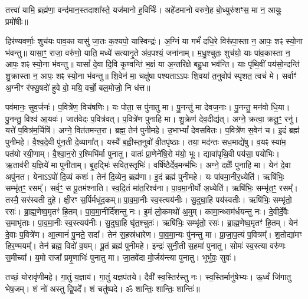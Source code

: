 तत्त्वा॑ यामि॒ ब्रह्म॑णा॒ वन्द॑मान॒स्तदाशा᳚स्ते॒ यज॑मानो ह॒विर्भिः॑। 
अहे॑डमानो वरुणे॒ह बो॒ध्युरु॑शꣳस॒ मा न॒ आयुः॒ प्रमो॑षीः॥

हिर॑ण्यवर्णाः॒ शुच॑यः पाव॒का यासु॑ जा॒तः क॒श्यपो॒ यास्विन्द्रः॑।
अ॒ग्निं या गर्भं॑ दधि॒रे विरू॑पा॒स्ता न॒ आपः॒ शꣴ स्यो॒ना भ॑वन्तु॥ 
यासा॒ꣳ॒ राजा॒ वरु॑णो॒ याति॒ मध्ये॑ सत्यानृ॒ते अ॑व॒पश्यं॒ जना॑नाम्।
म॒धु॒श्चुतः॒ शुच॑यो॒ याः पा॑व॒कास्ता न॒ आपः॒ शꣴ स्यो॒ना भ॑वन्तु॥ 
यासां᳚ दे॒वा दि॒वि कृ॒ण्वन्ति॑ भ॒क्षं या अ॒न्तरि॑क्षे बहु॒धा भव॑न्ति।
याः पृ॑थि॒वीं पय॑सो॒न्दन्ति॑ शु॒क्रास्ता न॒ आपः॒ शꣴ स्यो॒ना भ॑वन्तु॥ 
शि॒वेन॑ मा॒ चक्षु॑षा पश्यताऽऽपः शि॒वया॑ त॒नुवोप॑ स्पृशत॒ त्वचं॑ मे।
सर्वाꣳ॑ अ॒ग्नीꣳ र॑फ्सु॒षदो॑ हुवे वो॒ मयि॒ वर्चो॒ बल॒मोजो॒ नि ध॑त्त॥

पव॑मानः॒ सुव॒र्जनः॑। प॒वित्रे॑ण॒ विच॑\ur{}षणिः। यः पोता॒ स पु॑नातु मा। पु॒नन्तु॑ मा देवज॒नाः।
पु॒नन्तु॒ मन॑वो धि॒या। पु॒नन्तु॒ विश्व॑ आ॒यवः॑। जात॑वेदः प॒वित्र॑वत्। प॒वित्रे॑ण पुनाहि मा।
शु॒क्रेण॑ देव॒दीद्य॑त्। अग्ने॒ क्रत्वा॒ क्रतू॒ꣳ॒ रनु॑। यत्ते॑ प॒वित्र॑म॒र्चिषि॑। अग्ने॒ वित॑तमन्त॒रा।
ब्रह्म॒ तेन॑ पुनीमहे। उ॒भाभ्यां᳚ देवसवितः। प॒वित्रे॑ण स॒वेन॑ च। इ॒दं ब्रह्म॑ पुनीमहे।
वै॒श्व॒दे॒वी पु॑न॒ती दे॒व्यागा᳚त्। यस्यै॑ ब॒ह्वीस्त॒नुवो॑ वी॒तपृ॑ष्ठाः।
तया॒ मद॑न्तः सध॒माद्ये॑षु। व॒यꣴ स्या॑म॒ पत॑यो रयी॒णाम्।
वै॒श्वा॒न॒रो र॒श्मिभि॑र्मा पुनातु। वातः॑ प्रा॒णेने॑षि॒रो म॑यो॒ भूः।
द्यावा॑पृथि॒वी पय॑सा॒ पयो॑भिः। ऋ॒ताव॑री य॒ज्ञिये॑ मा पुनीताम्।
बृ॒हद्भिः॑ सवित॒स्तृभिः॑। वर्{}षि॑ष्ठैर्देव॒मन्म॑भिः।
अग्ने॒ दक्षैः᳚ पुनाहि मा। येन॑ दे॒वा अपु॑नत।
येनाऽऽपो॑ दि॒व्यं कशः॑। तेन॑ दि॒व्येन॒ ब्रह्म॑णा। इ॒दं ब्रह्म॑ पुनीमहे। यः पा॑वमा॒नीर॒ध्येति॑।
ऋषि॑भिः॒ सम्भृ॑त॒ꣳ॒ रसम्᳚। सर्व॒ꣳ॒ स पू॒तम॑श्नाति।
स्व॒दि॒तं मा॑त॒रिश्व॑ना। पा॒व॒मा॒नीर्यो अ॒ध्येति॑।
ऋषि॑भिः॒ सम्भृ॑त॒ꣳ॒ रसम्᳚। तस्मै॒ सर॑स्वती दुहे। क्षी॒रꣳ स॒र्पिर्मधू॑द॒कम्॥
पा॒व॒मा॒नीः स्व॒स्त्यय॑नीः। सु॒दुघा॒हि पय॑स्वतीः।
ऋषि॑भिः॒ सम्भृ॑तो॒ रसः॑। ब्रा॒ह्म॒णेष्व॒मृतꣳ॑ हि॒तम्।
पा॒व॒मा॒नीर्दि॑शन्तु नः। इ॒मं लो॒कमथो॑ अ॒मुम्।
कामा॒न्थ्सम॑र्धयन्तु नः। दे॒वीर्दे॒वैः स॒माभृ॑ताः।
पा॒व॒मा॒नीः स्व॒स्त्यय॑नीः। सु॒दुघा॒हि घृ॑त॒श्चुतः॑।
ऋषि॑भिः॒ सम्भृ॑तो॒ रसः॑। ब्रा॒ह्म॒णेष्व॒मृतꣳ॑ हि॒तम्।
येन॑ दे॒वाः प॒वित्रे॑ण। आ॒त्मानं॑ पु॒नते॒ सदा᳚।
तेन॑ स॒हस्र॑धारेण। पा॒व॒मा॒न्यः पु॑नन्तु मा।
प्रा॒जा॒प॒त्यं प॒वित्रम्᳚। श॒तोद्या॑मꣳ हिर॒ण्मयम्᳚।
तेन॑ ब्रह्म॒ विदो॑ व॒यम्। पू॒तं ब्रह्म॑ पुनीमहे।
इन्द्रः॑ सुनी॒ती स॒हमा॑ पुनातु। सोमः॑ स्व॒स्त्या वरु॑णः स॒मीच्या᳚।
य॒मो राजा᳚ प्रमृ॒णाभिः॑ पुनातु मा। जा॒तवे॑दा मो॒र्जय॑न्त्या पुनातु। भूर्भुवः॒ सुवः॑।

तच्छं॒ योरावृ॑णीमहे। गा॒तुं य॒ज्ञाय॑।
गा॒तुं यज्ञप॑तये। दैवी᳚ स्व॒स्तिर॑स्तु नः।
स्व॒स्तिर्मानु॑षेभ्यः। ऊ॒र्ध्वं जि॑गातु भेष॒जम्।
शं नो॑ अस्तु द्वि॒पदे᳚। शं चतु॑ष्पदे।
ॐ शान्तिः॒ शान्तिः॒ शान्तिः॑॥

